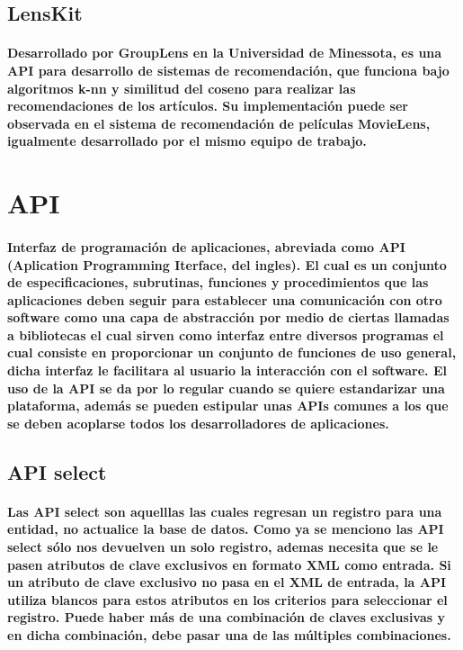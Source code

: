   \subsection{LensKit}
    \paragraph{Desarrollado por GroupLens en la Universidad de Minessota, es una API para desarrollo de sistemas de recomendación, que funciona bajo algoritmos k-nn y similitud del coseno para realizar las recomendaciones de los artículos. Su implementación puede ser observada en el sistema de recomendación de películas MovieLens, igualmente desarrollado por el mismo equipo de trabajo.}
  
\section{API}
  \paragraph{Interfaz de programación de aplicaciones, abreviada como API (Aplication Programming Iterface, del ingles). El cual es un conjunto de especificaciones, subrutinas, funciones y procedimientos que las aplicaciones deben seguir para establecer una comunicación con otro software como una capa de abstracción por medio de ciertas llamadas a bibliotecas el cual sirven como interfaz entre diversos programas el cual consiste en proporcionar un conjunto de funciones de uso general, dicha interfaz le facilitara al usuario la interacción con el software. El uso de la API se da por lo regular cuando se quiere estandarizar una plataforma, además se pueden estipular unas APIs comunes a los que se deben acoplarse todos los desarrolladores de aplicaciones. }
  
  \subsection{API select}
    \paragraph{Las API select son aquelllas las cuales regresan un registro para una entidad, no actualice la base de datos. Como ya se menciono las API select sólo nos devuelven un solo registro, ademas necesita que se le pasen atributos de clave exclusivos en formato XML como entrada. Si un atributo de clave exclusivo no pasa en el XML de entrada, la API utiliza blancos para estos atributos en los criterios para seleccionar el registro. Puede haber más de una combinación de claves exclusivas y en dicha combinación, debe pasar una de las múltiples combinaciones. }

